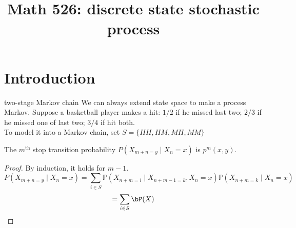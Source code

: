 \documentclass[lang=cn,11pt]{elegantbook}
\title{Math 526: discrete state stochastic process}
\begin{document}
\frontmatter
\tableofcontents
\mainmatter

\chapter{Introduction}



\begin{example}{two-stage Markov chain}
We can always extend state space to make a process Markov.
Suppose a basketball player makes a hit:
$1/2$ if he missed last two;
$2/3$ if he missed one of last two;
$3/4$ if hit both.\\
To model it into a Markov chain, set $S = \{  
HH,HM,MH,MM \}$

\end{example}





\begin{theorem}
    The $m^\text{th}$ stop transition probability $P(X_{m+n=y}\mid X_n = x)$ is $p^m(x,y)$.
\end{theorem}
\begin{proof}
    By induction, it holds for $m-1$.\\
    $$
    P(X_{m+n=y}\mid X_n = x) = \sum_{i \in S} \mathbb{P}(X_{n+m=i} \mid X_{n+m-1=k}, X_n = x) \mathbb{P}(X_{n+m=k}\mid X_n = x) 
    $$
    $$
    = \sum_{i \in S} \bP(X) 
    $$
\end{proof}
\end{document}
